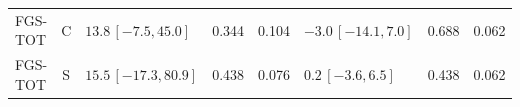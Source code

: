 \begin{longtable}{lcp{37mm}rrp{37mm}rr}
FGS-TOT & C & \(13.8\,[-7.5,45.0]\) & 0.344 & 0.104 & \(-3.0\,[-14.1,7.0]\) & 0.688 & 0.062\\
FGS-TOT & S & \(15.5\,[-17.3,80.9]\) & 0.438 & 0.076 & \(0.2\,[-3.6,6.5]\) & 0.438 & 0.062\\

\end{longtable}
